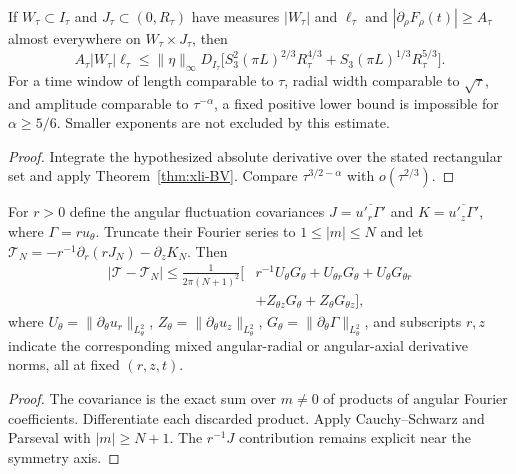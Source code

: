 \begin{corollary}
\label{cor:xli-spikes}
If $W_\tau\subset I_\tau$ and
$J_\tau\subset(0,R_\tau)$ have measures
$|W_\tau|$ and $\ell_\tau$ and
$|\partial_\rho F_\rho(t)|\ge A_\tau$ almost
everywhere on $W_\tau\times J_\tau$, then
\begin{equation}\label{eq:xli-spike}
\boxed{
A_\tau |W_\tau|\ell_\tau\le
\|\eta\|_\infty D_{I_\tau}
\bigl[S_3^2(\pi L)^{2/3}R_\tau^{4/3}
+S_3(\pi L)^{1/3}R_\tau^{5/3}\bigr].
}
\end{equation}
For a time window of length comparable to $\tau$,
radial width comparable to $\sqrt\tau$, and
amplitude comparable to $\tau^{-\alpha}$,
a fixed positive lower bound is impossible for
$\alpha\ge5/6$. Smaller exponents are not
excluded by this estimate.
\end{corollary}
\begin{proof}
Integrate the hypothesized absolute derivative
over the stated rectangular set and apply
Theorem~\ref{thm:xli-BV}. Compare
$\tau^{3/2-\alpha}$ with $o(\tau^{2/3})$.
\end{proof}

\begin{proposition}
\label{prop:xli-leakage}
For $r>0$ define the angular fluctuation covariances
$J=\overline{u'_r\Gamma'}$ and
$K=\overline{u'_z\Gamma'}$, where $\Gamma=ru_\theta$.
Truncate their Fourier series to
$1\le |m|\le N$ and let
$\mathcal T_N=-r^{-1}\partial_r(rJ_N)-\partial_zK_N$.
Then
\begin{equation}\label{eq:xli-leakage}
\boxed{\begin{aligned}
|\mathcal T-\mathcal T_N|
\le\frac1{2\pi(N+1)^2}\bigl[
&r^{-1}U_\theta G_\theta+
U_{\theta r}G_\theta+U_\theta G_{\theta r}\\
&+Z_{\theta z}G_\theta+Z_\theta G_{\theta z}
\bigr],
\end{aligned}}
\end{equation}
where $U_\theta=\|\partial_\theta u_r\|_{L^2_\theta}$,
$Z_\theta=\|\partial_\theta u_z\|_{L^2_\theta}$,
$G_\theta=\|\partial_\theta\Gamma\|_{L^2_\theta}$,
and subscripts $r,z$ indicate the corresponding
mixed angular-radial or angular-axial derivative norms,
all at fixed $(r,z,t)$.
\end{proposition}
\begin{proof}
The covariance is the exact sum over $m\ne0$
of products of angular Fourier coefficients.
Differentiate each discarded product. Apply
Cauchy--Schwarz and Parseval with
$|m|\ge N+1$. The $r^{-1}J$ contribution
remains explicit near the symmetry axis.
\end{proof}

